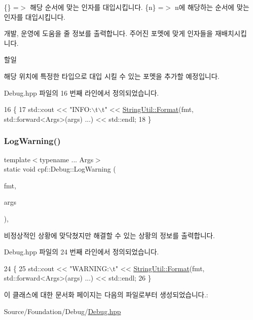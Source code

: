 \{\} =$>$ 해당 순서에 맞는 인자를 대입시킵니다. \{n\} =$>$ n에 해당하는 순서에 맞는 인자를 대입시킵니다. 

개발, 운영에 도움을 줄 정보를 출력합니다. 주어진 포멧에 맞게 인자들을 재배치시킵니다. \begin{DoxyRefDesc}{할일}
\item[\hyperlink{todo__todo000001}{할일}]해당 위치에 특정한 타입으로 대입 시킬 수 있는 포멧을 추가할 예정입니다. \end{DoxyRefDesc}


Debug.\+hpp 파일의 16 번째 라인에서 정의되었습니다.


\begin{DoxyCode}
16                                                               \{
17             std::cout << \textcolor{stringliteral}{"INFO:\(\backslash\)t\(\backslash\)t"}  << \hyperlink{classcpf_1_1_string_util_a965cca44ea396f01f2f3c5e3851f1001}{StringUtil::Format}(fmt, std::forward<Args>(args)
      ...) << std::endl;
18         \}
\end{DoxyCode}
\mbox{\label{classcpf_1_1_debug_a57373c6a7f52d7d41282596e2eb7d901}} 
\subsubsection{\texorpdfstring{Log\+Warning()}{LogWarning()}}
{\footnotesize\ttfamily template$<$typename ... Args$>$ \\
static void cpf\+::\+Debug\+::\+Log\+Warning (\begin{DoxyParamCaption}\item[{const \hyperlink{namespacecpf_a4dbd6992c3ed4440ce7ed8982ff7ffea}{String} \&}]{fmt,  }\item[{Args \&\&...}]{args }\end{DoxyParamCaption})\hspace{0.3cm}{\ttfamily [inline]}, {\ttfamily [static]}}

비정상적인 상황에 맞닥쳤지만 해결할 수 있는 상황의 정보를 출력합니다. 

Debug.\+hpp 파일의 24 번째 라인에서 정의되었습니다.


\begin{DoxyCode}
24                                                                  \{
25             std::cout << \textcolor{stringliteral}{"WARNING:\(\backslash\)t"} << \hyperlink{classcpf_1_1_string_util_a965cca44ea396f01f2f3c5e3851f1001}{StringUtil::Format}(fmt, std::forward<Args>(args)
      ...) << std::endl;
26         \}
\end{DoxyCode}


이 클래스에 대한 문서화 페이지는 다음의 파일로부터 생성되었습니다.\+:\begin{DoxyCompactItemize}
\item 
Source/\+Foundation/\+Debug/\hyperlink{_debug_8hpp}{Debug.\+hpp}\end{DoxyCompactItemize}
